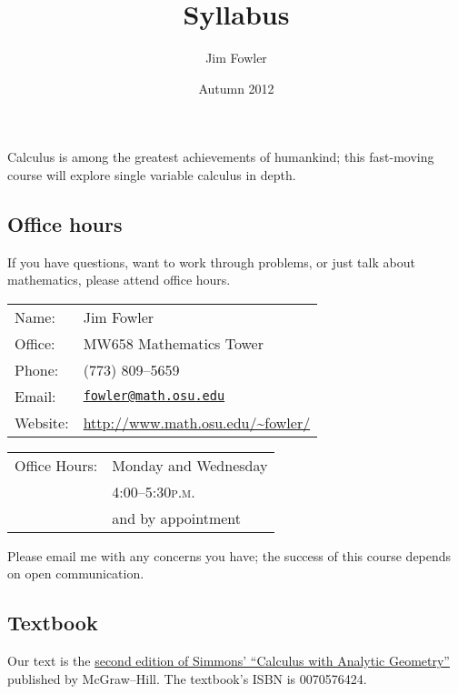 \documentclass[12pt]{handout}
\title{Syllabus}
\author{Jim Fowler}
\date{Autumn 2012}
\newcommand{\peem}{\textsc{p.m.}}
\begin{document}
\maketitle

\noindent Calculus is among the greatest achievements of humankind; this fast-moving course will explore single variable calculus in depth.



\subsection*{Office hours}
If you have questions, want to work through problems, or just talk
about mathematics, please attend office hours.

\vspace{1ex}%
\noindent\parbox{0.5\textwidth}{%
\noindent\begin{tabular}{@{}ll}
\textsf{Name:} & Jim Fowler \\
\textsf{Office:} & MW658 Mathematics Tower \\
\textsf{Phone:} & (773) 809--5659 \\
\textsf{Email:} & \href{mailto:fowler@math.osu.edu}{\texttt{fowler@math.osu.edu}} \\
\textsf{Website:} & \url{http://www.math.osu.edu/~fowler/}
\end{tabular}}
\noindent\parbox{0.5\textwidth}{%
\begin{tabular}{@{}ll}
\textsf{Office Hours:}
& Monday and Wednesday \\
& 4:00--5:30\peem \\
& and by appointment
\end{tabular}}

\vspace{1ex}\noindent
Please email me with any concerns you have; the success of this course
depends on open communication.

\subsection*{Textbook}
Our text is the \href{http://books.google.com/books?id=m1Q8AAAACAAJ}{second edition of Simmons' ``Calculus with Analytic Geometry''} published by McGraw--Hill.  The textbook's ISBN is 0070576424.
\end{document}
